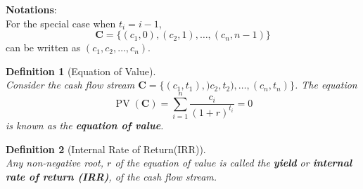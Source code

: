\documentclass[11pt]{article}
\newtheorem{definition}{Definition}[section]
\theoremstyle{definition}
\DeclareMathOperator{\PV}{PV}
\newcommand\cf[1]{\mathbf{#1}}
\begin{document}
\textbf{Notations}:\\
For the special case when $t_i = i-1$,
\[
\cf{C}=\{(c_1,0),(c_2,1),\ldots,(c_n,n-1)\}
\]
can be written as $(c_1,c_2,\ldots, c_n)$.
\begin{definition}[Equation of Value]
\hfill\\\normalfont Consider the cash flow stream $\cf{C}=\{(c_1,t_1),)c_2,t_2),\ldots,(c_n,t_n)\}$. The equation
\[
\PV(\cf{C})=\sum_{i=1}^n\frac{c_i}{(1+r)^{t_i}} = 0
\]
is known as the \textbf{equation of value}.
\end{definition}
\begin{definition}[Internal Rate of Return(IRR)]
\hfill\\\normalfont Any non-negative root, $r$ of the equation of value is called the \textbf{yield} or \textbf{internal rate of return (IRR)}, of the cash flow stream.
\end{definition}
\end{document}
